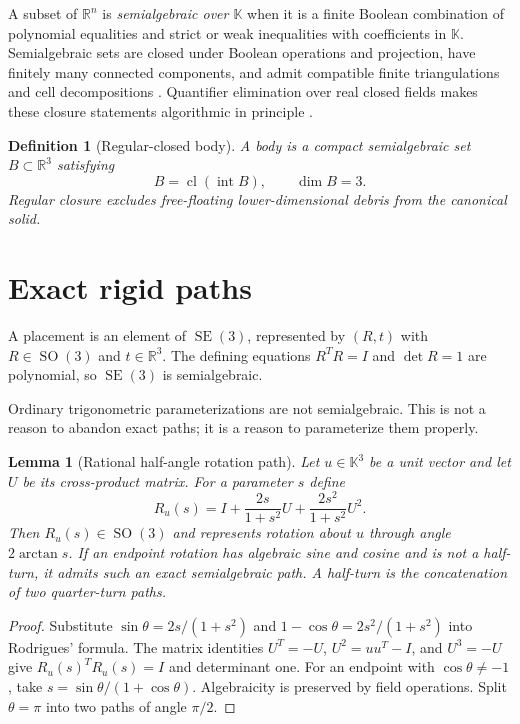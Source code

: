 \documentclass[11pt,openany]{book}
\newcommand{\R}{\mathbb R}
\newcommand{\K}{\mathbb K}
\newcommand{\SE}{\operatorname{SE}}
\newcommand{\SO}{\operatorname{SO}}
\newcommand{\Int}{\operatorname{int}}
\newcommand{\cl}{\operatorname{cl}}
\theoremstyle{polyplain}
\newtheorem{lemma}[theorem]{Lemma}
\theoremstyle{polydef}
\newtheorem{definition}[theorem]{Definition}
\begin{document}
A subset of $\R^n$ is \emph{semialgebraic over $\K$} when it is a finite Boolean combination of polynomial equalities and strict or weak inequalities with coefficients in $\K$. Semialgebraic sets are closed under Boolean operations and projection, have finitely many connected components, and admit compatible finite triangulations and cell decompositions \parencite{BasuPollackRoy2006,BochnakCosteRoy1998}. Quantifier elimination over real closed fields makes these closure statements algorithmic in principle \parencite{Collins1975}.

\begin{definition}[Regular-closed body]
A \emph{body} is a compact semialgebraic set $B\subset\R^3$ satisfying
\[
B=\cl(\Int B),\qquad \dim B=3.
\]
Regular closure excludes free-floating lower-dimensional debris from the canonical solid.
\end{definition}

\section{Exact rigid paths}

A placement is an element of $\SE(3)$, represented by $(R,t)$ with $R\in\SO(3)$ and $t\in\R^3$. The defining equations $R^TR=I$ and $\det R=1$ are polynomial, so $\SE(3)$ is semialgebraic.

Ordinary trigonometric parameterizations are not semialgebraic. This is not a reason to abandon exact paths; it is a reason to parameterize them properly.

\begin{lemma}[Rational half-angle rotation path]
\label{lem:half-angle-path}
Let $u\in\K^3$ be a unit vector and let $U$ be its cross-product matrix. For a parameter $s$ define
\[
R_u(s)=I+\frac{2s}{1+s^2}U+\frac{2s^2}{1+s^2}U^2.
\]
Then $R_u(s)\in\SO(3)$ and represents rotation about $u$ through angle $2\arctan s$. If an endpoint rotation has algebraic sine and cosine and is not a half-turn, it admits such an exact semialgebraic path. A half-turn is the concatenation of two quarter-turn paths.
\end{lemma}

\begin{proof}
Substitute $\sin\theta=2s/(1+s^2)$ and $1-\cos\theta=2s^2/(1+s^2)$ into Rodrigues' formula. The matrix identities $U^T=-U$, $U^2=uu^T-I$, and $U^3=-U$ give $R_u(s)^TR_u(s)=I$ and determinant one. For an endpoint with $\cos\theta\ne-1$, take $s=\sin\theta/(1+\cos\theta)$. Algebraicity is preserved by field operations. Split $\theta=\pi$ into two paths of angle $\pi/2$.
\end{proof}
\end{document}
